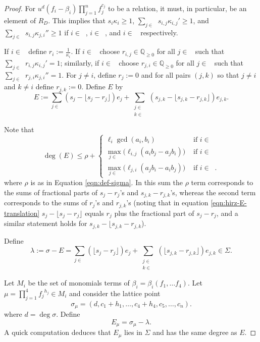 \documentclass{amsart}
\theoremstyle{plain}
\theoremstyle{definition}
\theoremstyle{remark}
\numberwithin{equation}{section}
\newcommand\bq{{\mathbb Q}}
\newcommand\bida{a}
\newcommand\bidb{b}
\DeclareMathOperator{\Te}{T_=}
\DeclareMathOperator{\Tp}{T_+}
\DeclareMathOperator{\Tm}{T_-}
\begin{document}
\begin{proof}
For $u^d (f_i - \beta_i)\prod_{j=1}^n f_j^{c_j}$ to be a relation, it must, in particular, be an element of $R_D$. This implies that $s_i\kappa_i\ge 1$, $\sum_{j\in \Tm} s_{i,j}\kappa_{i,j}' \ge 1$, and $\sum_{j\in \Tp} s_{i,j}\kappa_{j,i}'' \ge 1$ if $i\in \Te$, $i\in \Tp$, and $i\in \Tm$ respectively.

If $i\in \Te$ define $r_i := \frac{1}{\kappa_i}$.  If $i\in \Tp$ choose $r_{i,j}\in \bq_{\ge 0}$ for all $j\in \Tm$ such that $\sum_{j\in \Tm} r_{i,j}\kappa_{i,j}' = 1$; similarly, if $i\in \Tm$ choose $r_{j,i}\in \bq_{\ge 0}$ for all $j\in \Tp$ such that $\sum_{j\in \Tm} r_{j,i}\kappa_{j,i}'' = 1$.  For $j\ne i$, define $r_j := 0$ and for all pairs $(j,k)$ so that $j \neq i$ and $k \neq i$ define $r_{j,k} := 0$.
Define $E$ by
\begin{equation}\label{eqn:hirz-E-translation}
	E := \sum_{j\in \Te} (s_j - \lfloor s_j - r_j \rfloor) e_j + \sum_{\substack{j \in 
	\Tp \\ k \in \Tm}} (s_{j,k} - \lfloor s_{j,k} - r_{j,k} \rfloor) e_{j,k}.
\end{equation}


Note that
\[
	\deg(E) \le \rho + \begin{cases}
	\ell_i \gcd(\bida_i, \bidb_i)	&\mbox{ if } i \in \Te \\
	\max_{j \in \Tm} \bigl(\ell_{i, j} (\bida_i \bidb_j - \bida_j \bidb_i)\bigr)
	&\mbox{ if } i \in \Tp \\
	\max_{j \in \Tp} \bigl(\ell_{j, i} (\bida_j \bidb_ i - \bida_i \bidb_j) \bigr)
	&\mbox{ if } i \in \Tm. \end{cases}
\]
where $\rho$ is as in Equation \ref{eqn:def-sigma}.  In this sum the $\rho$ term corresponds to the sums of fractional parts of $s_j - r_j$'s and $s_{j,k} - r_{j,k}$'s, whereas the second term corresponds to the sums of $r_j$'s and $r_{j,k}$'s (noting that in equation \ref{eqn:hirz-E-translation} $s_j - \lfloor s_j - r_j \rfloor$ equals $r_j$ plus the fractional part of $s_j - r_j$, and a similar statement holds for $s_{j,k} - \lfloor s_{j,k} - r_{j,k}$).

Define
\begin{equation}\label{eqn:defn-lambda}
	\lambda := \sigma - E = \sum_{j\in \Te} (\lfloor s_j - r_j\rfloor) e_j + \sum_{\substack{j\in \Tp \\ k\in \Tm}} ( \lfloor s_{j,k} - r_{j,k}\rfloor)e_{j,k}\in \Sigma.
 \end{equation}

Let $M_i$ be the set of monomials terms of $\beta_i = \beta_i(f_1, \ldots f_4)$.  Let $\mu = \prod_{j=1}^4
{f_j}^{h_j}\in M_i$ and consider the lattice point 
\[
	\sigma_\mu = (d, c_1 + h_1, \ldots, c_4+h_4, c_5, \ldots, c_n).
\]
where $d = \deg \sigma$.
Define 
\[
	E_\mu = \sigma_\mu - \lambda.
\]
A quick computation deduces that $E_\mu$ lies in $\Sigma$ 
and has the same degree as $E$.


\end{proof}
\end{document}

